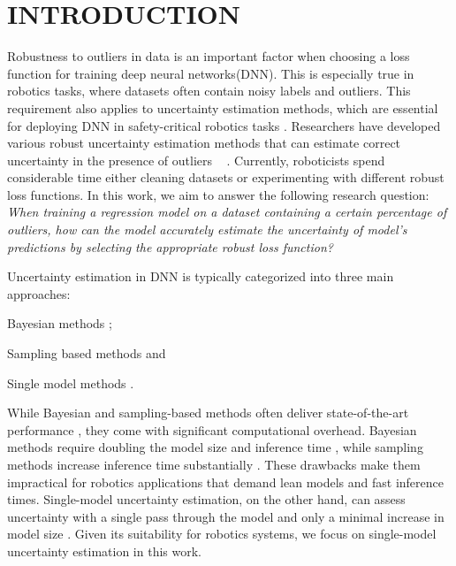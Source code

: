\documentclass[letterpaper, 10 pt, conference]{ieeeconf}  %
\begin{document}
\section{INTRODUCTION}
Robustness to outliers in data is an important factor when choosing a loss function for training deep neural networks(DNN). This is especially true in robotics tasks, where datasets often contain noisy labels and outliers.
This requirement also applies to uncertainty estimation methods, which are essential for deploying DNN in safety-critical robotics tasks \cite{borg_safely_2019, schwalbe_survey_2020}.
Researchers have developed various robust uncertainty estimation methods that can estimate correct uncertainty in the presence of outliers ~\cite{nair_laplace_2O22, barron2019general} .
Currently, roboticists spend considerable time either cleaning datasets or experimenting with different robust loss functions. 
In this work, we aim to answer the following research question: \textit{When training a regression model on a dataset containing a certain percentage of outliers, how can the model accurately estimate the uncertainty of model's predictions by selecting the appropriate robust loss function?}

Uncertainty estimation in DNN is typically categorized into three main approaches: 
\begin{inparaenum}
	\item Bayesian methods \cite{kendall_what_2017, dusenberry2020analyzing}; \item Sampling based methods \cite{gal_dropout_2016, lakshminarayanan_simple_2016} and 
	\item Single model methods \cite{nix1994estimating} \cite{amini_deep_2019, sensoy_evidential_2018, nair_laplace_2O22}.
\end{inparaenum}
 While Bayesian and sampling-based methods often deliver state-of-the-art performance \cite{dusenberry2020efficient, wen2020batchensemble}, they come with significant computational overhead. Bayesian methods require doubling the model size and inference time \cite{blundell2015weight} , while sampling methods increase inference time substantially \cite{gal_dropout_2016, lakshminarayanan_simple_2016} . These drawbacks make them impractical for robotics applications that demand lean models and fast inference times. Single-model uncertainty estimation, on the other hand, can assess uncertainty with a single pass through the model and only a minimal increase in model size \cite{nix1994estimating, malinin_regression_2020, sensoy_evidential_2018} . Given its suitability for robotics systems, we focus on single-model uncertainty estimation in this work.
\end{document}
